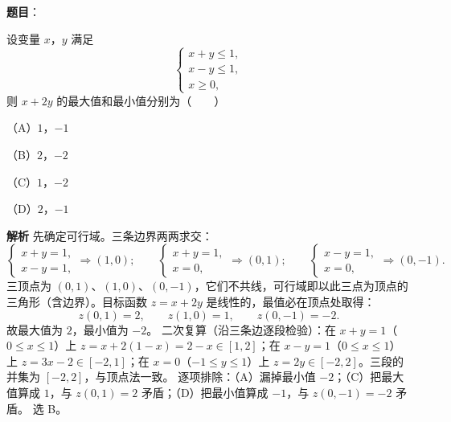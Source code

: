 \begin{answer}

\textbf{题目}：

设变量 $x$，$y$ 满足
\nopagebreak[4]
\[
\begin{cases}
x+y\leqslant1,\\
x-y\leqslant1,\\
x\geqslant0,
\end{cases}
\]
则 $x+2y$ 的最大值和最小值分别为\mbox{（　　）}

（A）$1$，$-1$

（B）$2$，$-2$

（C）$1$，$-2$

（D）$2$，$-1$

\textbf{解析}
先确定可行域。三条边界两两求交：
\nopagebreak[4]
\[
\begin{cases}x+y=1,\\ x-y=1,\end{cases}\Rightarrow(1,0);\qquad
\begin{cases}x+y=1,\\ x=0,\end{cases}\Rightarrow(0,1);\qquad
\begin{cases}x-y=1,\\ x=0,\end{cases}\Rightarrow(0,-1).
\]
三顶点为 $(0,1)$、$(1,0)$、$(0,-1)$，它们不共线，可行域即以此三点为顶点的三角形（含边界）。目标函数 $z=x+2y$ 是线性的，最值必在顶点处取得：
\nopagebreak[4]
\[
z(0,1)=2,\qquad z(1,0)=1,\qquad z(0,-1)=-2.
\]
故最大值为 $2$，最小值为 $-2$。
二次复算（沿三条边逐段检验）：在 $x+y=1$（$0\leqslant x\leqslant1$）上 $z=x+2(1-x)=2-x\in[1,2]$；在 $x-y=1$（$0\leqslant x\leqslant1$）上 $z=3x-2\in[-2,1]$；在 $x=0$（$-1\leqslant y\leqslant1$）上 $z=2y\in[-2,2]$。三段的并集为 $[-2,2]$，与顶点法一致。
逐项排除：（A）漏掉最小值 $-2$；（C）把最大值算成 $1$，与 $z(0,1)=2$ 矛盾；（D）把最小值算成 $-1$，与 $z(0,-1)=-2$ 矛盾。
选 B。


\end{answer}

